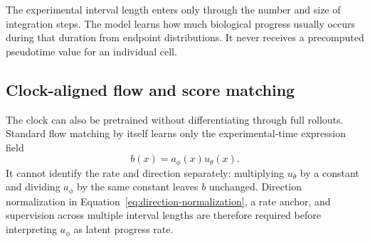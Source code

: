 \documentclass[11pt]{article}
\begin{document}
The experimental interval length enters only through the number and size of
integration steps. The model learns how much biological progress usually
occurs during that duration from endpoint distributions. It never receives a
precomputed pseudotime value for an individual cell.

\subsection{Clock-aligned flow and score matching}

The clock can also be pretrained without differentiating through full
rollouts. Standard flow matching by itself learns only the experimental-time
expression field
\begin{equation}
  b(x)=a_\phi(x)u_\theta(x).
  \label{eq:rate-direction-product}
\end{equation}
It cannot identify the rate and direction separately: multiplying
$u_\theta$ by a constant and dividing $a_\phi$ by the same constant leaves
$b$ unchanged. Direction normalization in
Equation~\ref{eq:direction-normalization}, a rate anchor, and supervision
across multiple interval lengths are therefore required before interpreting
$a_\phi$ as latent progress rate.
\end{document}
